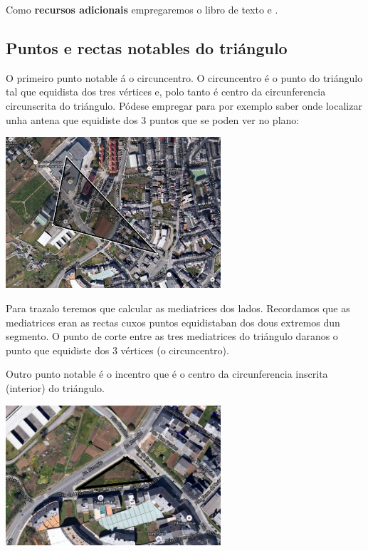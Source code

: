 Como \textbf{recursos adicionais} empregaremos o libro de texto e \cite{yt:angulostriangulos}.



\subsection{Puntos e rectas notables do triángulo}

O primeiro punto notable á o circuncentro. O circuncentro é o punto do triángulo tal que equidista dos tres vértices e, polo tanto é centro da circunferencia circunscrita do triángulo. Pódese empregar para por exemplo saber onde localizar unha antena que equidiste dos 3 puntos que se poden ver no plano:

\begin{center}
\includegraphics[width=0.6\textwidth]{img/circuncentro.png}
\end{center}

Para trazalo teremos que calcular as mediatrices dos lados. Recordamos que as mediatrices eran as rectas cuxos puntos equidistaban dos dous extremos dun segmento. O punto de corte entre as tres mediatrices do triángulo daranos o punto que equidiste dos 3 vértices (o circuncentro).

Outro punto notable é o incentro que é o centro da circunferencia inscrita (interior) do triángulo.

\begin{center}
\includegraphics[width=0.6\textwidth]{img/incentro.png}
\end{center}

